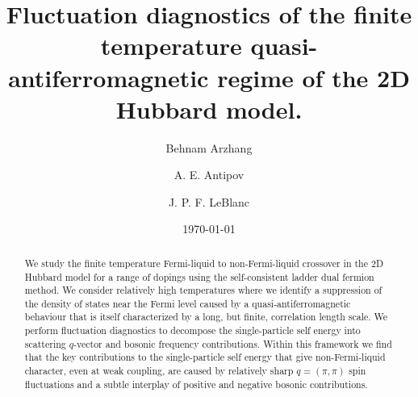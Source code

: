 \documentclass[twocolumn,notitlepage,prb,superscriptaddress,showpacs]{revtex4-1}
\begin{document}
\title{Fluctuation diagnostics of the finite temperature quasi-antiferromagnetic regime of the 2D Hubbard model.}
\author{Behnam Arzhang}
\author{A. E. Antipov}
\author{J. P. F. LeBlanc}

\date{\today}

\begin{abstract}
We study the finite temperature Fermi-liquid to non-Fermi-liquid crossover in the 2D Hubbard model for a range of dopings using the self-consistent ladder dual fermion method.
 We consider relatively high temperatures where we identify a suppression of the density of states near the Fermi level caused by a quasi-antiferromagnetic behaviour that is itself characterized by a long, but finite, correlation length scale.  We perform fluctuation diagnostics to decompose the single-particle self energy into scattering $q$-vector and bosonic frequency contributions.  Within this framework we find that the key contributions to the single-particle self energy that give non-Fermi-liquid character, even at weak coupling, are caused by relatively sharp $q=(\pi,\pi)$ spin fluctuations and a subtle interplay of positive and negative bosonic contributions.
\end{abstract}

\maketitle
\end{document}
